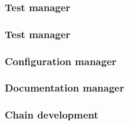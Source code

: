 \documentclass{report}
\begin{document}
\paragraph{}
\hspace{4mm}\textnormal{}

\subsubsection{Test manager}

\paragraph{}
\hspace{4mm}\textnormal{}

\subsubsection{Test manager}

\paragraph{}
\hspace{4mm}\textnormal{}

\subsubsection{Configuration manager}

\paragraph{}
\hspace{4mm}\textnormal{}

\subsubsection{Documentation manager}

\paragraph{}
\hspace{4mm}\textnormal{}

\subsubsection{Chain development}
\end{document}
